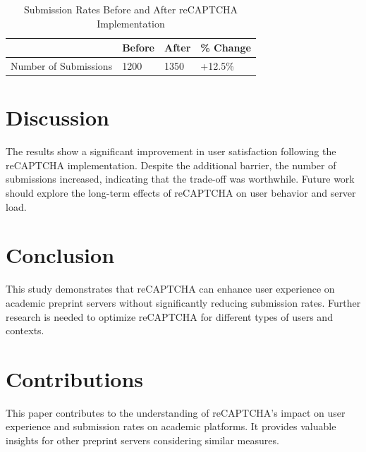 \documentclass{article}
\begin{document}
\begin{table}[ht]
\centering
\caption{Submission Rates Before and After reCAPTCHA Implementation}
\label{tab:submission}
\begin{tabular}{@{}llll@{}}
\toprule
& Before & After & \% Change \\
\midrule
Number of Submissions & 1200 & 1350 & +12.5\% \\
\bottomrule
\end{tabular}
\end{table}

\section{Discussion}
The results show a significant improvement in user satisfaction following the reCAPTCHA implementation. Despite the additional barrier, the number of submissions increased, indicating that the trade-off was worthwhile. Future work should explore the long-term effects of reCAPTCHA on user behavior and server load.

\section{Conclusion}
This study demonstrates that reCAPTCHA can enhance user experience on academic preprint servers without significantly reducing submission rates. Further research is needed to optimize reCAPTCHA for different types of users and contexts.

\section{Contributions}
This paper contributes to the understanding of reCAPTCHA's impact on user experience and submission rates on academic platforms. It provides valuable insights for other preprint servers considering similar measures.



\end{document}
